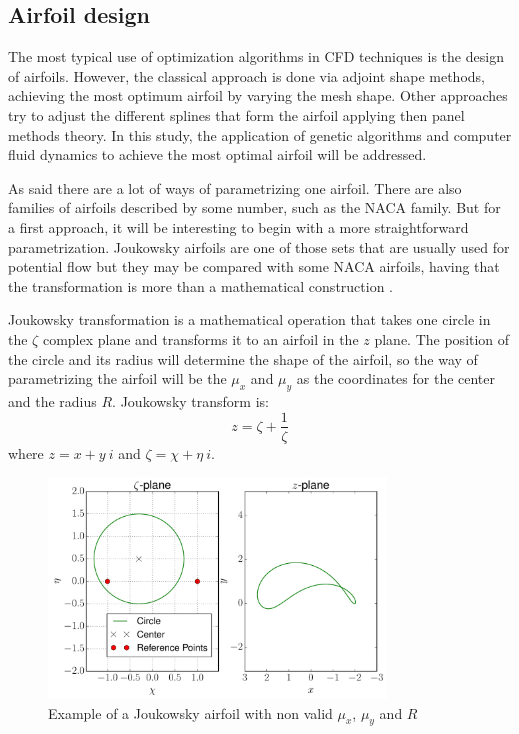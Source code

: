 \vspace{2mm}

\newpage

\subsection{Airfoil design}


The most typical use of optimization algorithms in CFD techniques is the design of airfoils. However, the classical approach is done via adjoint shape methods, achieving the most optimum airfoil by varying the mesh shape. Other approaches try to adjust the different splines that form the airfoil applying then panel methods theory. In this study, the application of genetic algorithms and computer fluid dynamics to achieve the most optimal airfoil will be addressed. 

As said there are a lot of ways of parametrizing one airfoil. There are also families of airfoils described by some number, such as the NACA family. But for a first approach, it will be interesting to begin with a more straightforward parametrization. Joukowsky airfoils are one of those sets that are usually used for potential flow but they may be compared with some NACA airfoils, having that the transformation is more than a mathematical construction \cite{kapania2008modeling}.

Joukowsky transformation is a mathematical operation that takes one circle in the $\zeta$ complex plane and transforms it to an airfoil in the $z$ plane. The position of the circle and its radius will determine the shape of the airfoil, so the way of parametrizing the airfoil will be the $\mu_x$ and $\mu_y$ as the coordinates for the center and the radius $R$. Joukowsky transform is:
\begin{equation}
z=\zeta+\dfrac{1}{\zeta}
\end{equation}
where $z = x + y\ i$ and $\zeta = \chi + \eta\ i$. 

     \begin{figure}[h!]
        \centering
        \includegraphics[width=0.8\textwidth]{Figures/3/nonJouk2.pdf}
        \caption{Example of a Joukowsky airfoil with non valid $\mu_x$, $\mu_y$ and $R$}
        \label{fig:nonJoukowsky}
    \end{figure}

